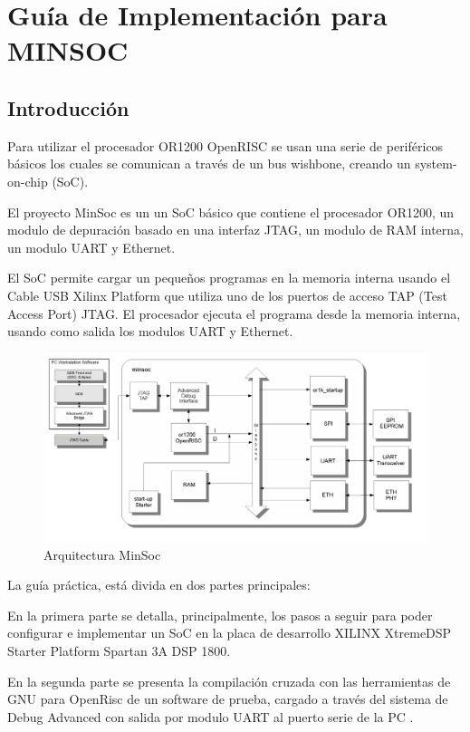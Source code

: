 
\chapter{Guía de Implementación para MINSOC}
	\section{Introducción}

Para utilizar el procesador OR1200 OpenRISC se usan una serie de periféricos básicos los cuales se comunican a través de un bus wishbone, creando un system-on-chip (SoC). 

El proyecto MinSoc es un un SoC básico que  contiene el procesador OR1200, un modulo de depuración basado en una interfaz JTAG, un modulo de RAM  interna, un modulo UART y Ethernet.

El SoC permite cargar un pequeños programas en la memoria interna usando el Cable USB  Xilinx Platform que utiliza uno de los puertos de acceso TAP (Test Access Port) JTAG. El procesador ejecuta el programa desde la memoria interna, usando como salida los modulos UART y Ethernet. 

\begin{figure}[h!]
 \begin{center}
  \includegraphics[width=1\textwidth,keepaspectratio=true]{./images/minsoc}
  \caption{Arquitectura MinSoc}
  \label{fig:esquema}
 \end{center}
\end{figure}

La guía práctica, está divida en dos partes principales: 

En la primera parte se detalla, principalmente, los pasos a seguir para poder configurar e implementar un SoC en la placa de desarrollo XILINX XtremeDSP Starter Platform Spartan 3A DSP 1800.


En la segunda parte se presenta la compilación cruzada con las herramientas de GNU para OpenRisc de un software de prueba, cargado a través del sistema de Debug Advanced con salida por modulo UART al puerto serie de la PC .

